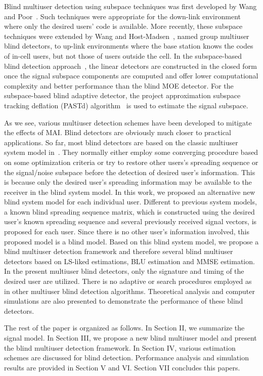 \documentclass[a4paper,11pt,fleqn]{article}
\begin{document}
Blind multiuser detection using subspace techniques was first
developed by Wang and Poor~\cite{Wang98, Poor98}. Such techniques
were appropriate for the down-link environment where only the
desired users' code is available. More recently, these subspace
techniques were extended by Wang and Host-Madsen~\cite{Wang99},
named group multiuser blind detectors, to up-link environments
where the base station knows the codes of in-cell users, but not
those of users outside the cell. In the subspace-based blind
detection approach~\cite{Wang98}, the linear detectors are
constructed in the closed form once the signal subspace components
are computed and offer lower computational complexity and better
performance than the blind MOE detector. For the subspace-based
blind adaptive detector, the project approximation subspace
tracking deflation (PASTd) algorithm~\cite{Yang95} is used to
estimate the signal subspace.

As we see, various multiuser detection schemes have been developed
to mitigate the effects of MAI. Blind detectors are obviously much
closer to practical applications. So far, most blind detectors are
based on the classic multiuser system model in~\cite{Verd98}. They
normally either employ some converging procedure based on some
optimization criteria or try to restore other users's spreading
sequence or the signal/noise subspace before the detection of
desired user's information. This is because only the desired
user's spreading information may be available to the receiver in
the blind system model. In this work, we proposed an alternative
new blind system model for each individual user. Different to
previous system models, a known blind spreading sequence matrix,
which is constructed using the desired user's known spreading
sequence and several previously received signal vectors, is
proposed for each user. Since there is no other user's information
involved, this proposed model is a blind model. Based on this
blind system model, we propose a blind multiuser detection
framework and therefore several blind multiuser detectors based on
LS-liked estimations, BLU estimation and MMSE estimation. In the
present multiuser blind detectors, only the signature and timing
of the desired user are utilized. There is no adaptive or search
procedures employed as in other multiuser blind detection
algorithms. Theoretical analysis and computer simulations are also
presented to demonstrate the performance of these blind detectors.

The rest of the paper is organized as follows. In Section II, we
summarize the signal model. In Section III, we propose a new blind
multiuser model and present the blind multiuser detection
framework. In Section IV, various estimation schemes are discussed
for blind detection. Performance analysis and simulation results
are provided in Section V and VI. Section VII concludes this
papers.
\end{document}
